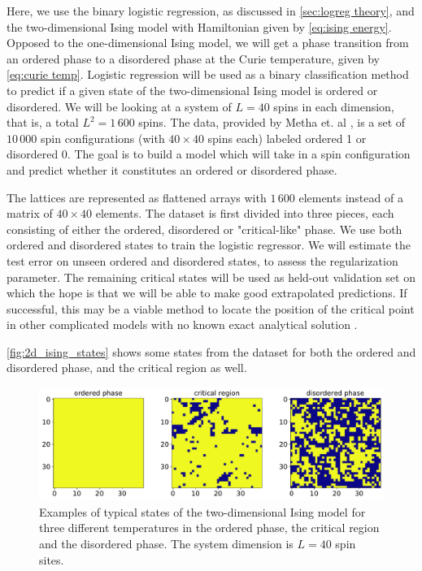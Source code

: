 Here, we use the binary logistic regression, as discussed in \autoref{sec:logreg theory}, and the two-dimensional Ising model with Hamiltonian given by \autoref{eq:ising energy}. Opposed to the one-dimensional Ising model, we will get a phase transition from an ordered phase to a disordered phase at the Curie temperature, given by \autoref{eq:curie temp}. Logistic regression will be used as a binary classification method to predict if a given state of the two-dimensional Ising model is ordered or disordered. We will be looking at a system of $L=40$ spins in each dimension, that is, a total $L^2 = 1\,600$ spins. The data, provided by Metha et. al \cite{Mehta_2019}, is a set of $10 \,000$ spin configurations (with $40 \times 40$ spins each) labeled ordered 1 or disordered 0. The goal is to build a model which will take in a spin configuration and predict whether it constitutes an ordered or disordered phase. 

The lattices are represented as flattened arrays with $1\,600$ elements instead of a matrix of $40 \times 40$ elements. The dataset is first divided into three pieces, each consisting of either the ordered, disordered or "critical-like" phase. We use both ordered and disordered states to train the logistic regressor. We will estimate the test error on unseen ordered and disordered states, to assess the regularization parameter. The remaining critical states will be used as held-out validation set on which the hope is that we will be able to make good extrapolated predictions. If successful, this may be a viable method to locate the position of the critical point in other complicated models with no known exact analytical solution \cite{Mehta_2019}.

\autoref{fig:2d_ising_states} shows some states from the dataset for both the ordered and disordered phase, and the critical region as well. 

\begin{figure}[H]
\begin{center}\includegraphics[scale=0.5]{latex/figures/ising_states.pdf}
\end{center}
\caption{Examples of typical states of the two-dimensional Ising model for three different temperatures in the ordered phase, the critical region and the disordered phase. The system dimension is $L=40$ spin sites.}
\label{fig:2d_ising_states}
\end{figure}

